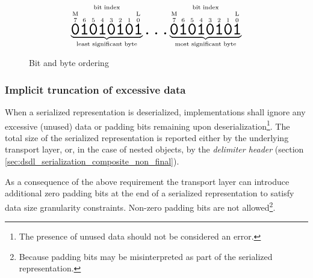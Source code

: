 \begin{figure}[H]
    $$
    \overset{\text{bit index}}{%
        \underbrace{%
            \overset{\text{M}}{\overset{7}{\hugett{0}}}
            \overset{6}{\hugett{1}}
            \overset{5}{\hugett{0}}
            \overset{4}{\hugett{1}}
            \overset{3}{\hugett{0}}
            \overset{2}{\hugett{1}}
            \overset{1}{\hugett{0}}
            \overset{\text{L}}{\overset{0}{\hugett{1}}}
        }_\text{least significant byte}%
    }
    \hugett{\ldots}
    \overset{\text{bit index}}{%
        \underbrace{%
            \overset{\text{M}}{\overset{7}{\hugett{0}}}
            \overset{6}{\hugett{1}}
            \overset{5}{\hugett{0}}
            \overset{4}{\hugett{1}}
            \overset{3}{\hugett{0}}
            \overset{2}{\hugett{1}}
            \overset{1}{\hugett{0}}
            \overset{\text{L}}{\overset{0}{\hugett{1}}}
        }_\text{most significant byte}%
    }
    $$
    \caption{Bit and byte ordering\label{fig:dsdl_serialization_bit_ordering}}
\end{figure}

\subsubsection{Implicit truncation of excessive data}\label{sec:dsdl_serialization_implicit_truncation}

When a serialized representation is deserialized, implementations shall ignore
any excessive (unused) data or padding bits remaining upon deserialization\footnote{%
    The presence of unused data should not be considered an error.
}.
The total size of the serialized representation is reported either by the underlying transport layer, or,
in the case of nested objects, by the \emph{delimiter header}
(section \ref{sec:dsdl_serialization_composite_non_final}).

As a consequence of the above requirement the transport layer can introduce
additional zero padding bits at the end of a serialized representation
to satisfy data size granularity constraints.
Non-zero padding bits are not allowed\footnote{%
    Because padding bits may be misinterpreted as part of the serialized representation.
}.

